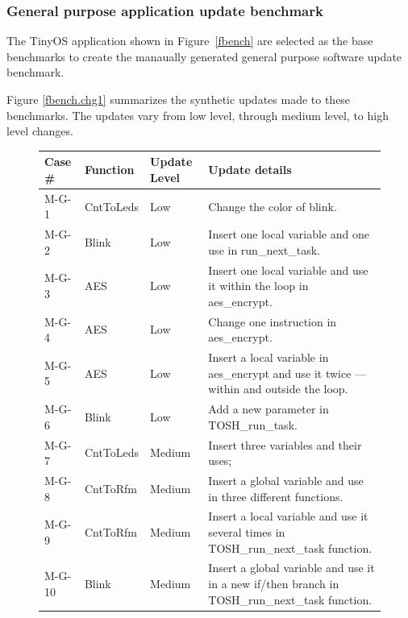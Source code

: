 \subsubsection{General purpose application update benchmark}
The TinyOS application shown in Figure~\ref{fbench} are selected as the base benchmarks
to create the manaually generated general purpose software update benchmark.


Figure \ref{fbench.chg1} summarizes the synthetic updates made to these
benchmarks. The updates vary from low level, through medium level, to high level changes.

\begin{figure}[htbp]
\centering
\begin{small}
\begin{tabular}{||p{0.6in}|p{1in}|p{0.5in}|p{3.5in}||} \hline
Case \# & Function & Update Level & Update details \\ \hline \hline

M-G-1 & CntToLeds &Low & Change the color of blink. \\ \hline

M-G-2 & Blink &Low & Insert one local variable and one use in
run\_next\_task. \\ \hline

M-G-3 & AES& Low & Insert one local variable and use it within the
loop in aes\_encrypt. \\ \hline

M-G-4 & AES & Low & Change one instruction in aes\_encrypt. \\ \hline

M-G-5 & AES & Low & Insert a local variable in aes\_encrypt and use it
twice --- within and outside the loop. \\ \hline

M-G-6 & Blink &Low &Add a new parameter in TOSH\_run\_task. \\ \hline

M-G-7 & CntToLeds & Medium & Insert three variables and their uses; \\ \hline

M-G-8 & CntToRfm & Medium & Insert a global variable and use in three different functions. \\ \hline

M-G-9 & CntToRfm & Medium & Insert a local variable and use it several times in TOSH\_run\_next\_task function. \\ \hline

M-G-10 & Blink&Medium & Insert a global variable and use it in a new if/then branch in TOSH\_run\_next\_task function. \\ \hline


\end{tabular}
\end{small}
\end{figure}
